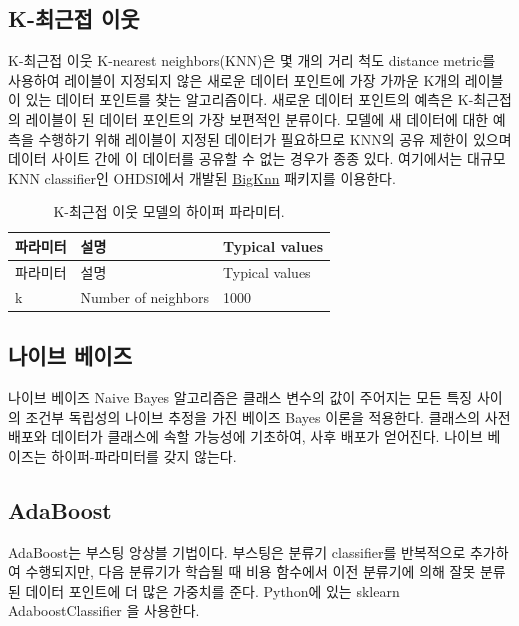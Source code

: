 \documentclass[10.5pt]{book}
\theoremstyle{definition}
\theoremstyle{definition}
\theoremstyle{definition}
\theoremstyle{remark}
\begin{document}
\subsection{K-최근접 이웃}\label{k--}

K-최근접 이웃 K-nearest neighbors(KNN)은 몇 개의 거리 척도 distance
metric를 사용하여 레이블이 지정되지 않은 새로운 데이터 포인트에 가장
가까운 K개의 레이블이 있는 데이터 포인트를 찾는 알고리즘이다. 새로운
데이터 포인트의 예측은 K-최근접의 레이블이 된 데이터 포인트의 가장
보편적인 분류이다. 모델에 새 데이터에 대한 예측을 수행하기 위해 레이블이
지정된 데이터가 필요하므로 KNN의 공유 제한이 있으며 데이터 사이트 간에
이 데이터를 공유할 수 없는 경우가 종종 있다. 여기에서는 대규모 KNN
classifier인 OHDSI에서 개발된
\href{https://github.com/OHDSI/BigKnn}{BigKnn} 패키지를 이용한다.
 

\begin{longtable}[]{@{}lll@{}}
\caption{\label{tab:knnParameters} K-최근접 이웃 모델의 하이퍼
파라미터.}\tabularnewline
\toprule
파라미터 & 설명 & Typical values\tabularnewline
\midrule
\endfirsthead
\toprule
파라미터 & 설명 & Typical values\tabularnewline
\midrule
\endhead
k & Number of neighbors & 1000\tabularnewline
\bottomrule
\end{longtable}

\subsection{나이브 베이즈}\label{-}

나이브 베이즈 Naive Bayes 알고리즘은 클래스 변수의 값이 주어지는 모든
특징 사이의 조건부 독립성의 나이브 추정을 가진 베이즈 Bayes 이론을
적용한다. 클래스의 사전 배포와 데이터가 클래스에 속할 가능성에 기초하여,
사후 배포가 얻어진다. 나이브 베이즈는 하이퍼-파라미터를 갖지 않는다.

\subsection{AdaBoost}\label{adaboost}

AdaBoost는 부스팅 앙상블 기법이다. 부스팅은 분류기 classifier를
반복적으로 추가하여 수행되지만, 다음 분류기가 학습될 때 비용 함수에서
이전 분류기에 의해 잘못 분류된 데이터 포인트에 더 많은 가중치를 준다.
Python에 있는 sklearn AdaboostClassifier 을 사용한다. 
\end{document}
